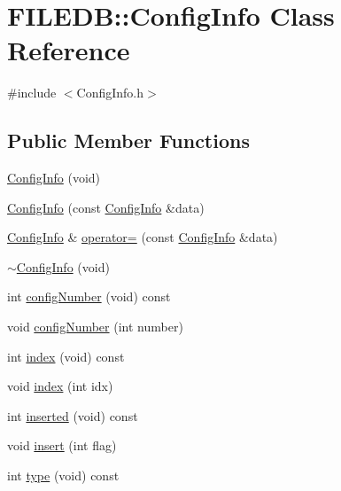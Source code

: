 \hypertarget{classFILEDB_1_1ConfigInfo}{}\section{F\+I\+L\+E\+DB\+:\+:Config\+Info Class Reference}
\label{classFILEDB_1_1ConfigInfo}


{\ttfamily \#include $<$Config\+Info.\+h$>$}

\subsection*{Public Member Functions}
\begin{DoxyCompactItemize}
\item 
\mbox{\hyperlink{classFILEDB_1_1ConfigInfo_a5aa818d39aeb907f27e064cab48c3522}{Config\+Info}} (void)
\item 
\mbox{\hyperlink{classFILEDB_1_1ConfigInfo_aa36d3fc640cd713ac561f89483c1b5f9}{Config\+Info}} (const \mbox{\hyperlink{classFILEDB_1_1ConfigInfo}{Config\+Info}} \&data)
\item 
\mbox{\hyperlink{classFILEDB_1_1ConfigInfo}{Config\+Info}} \& \mbox{\hyperlink{classFILEDB_1_1ConfigInfo_ac41b56638fe1c002bc2712d16c9cbecb}{operator=}} (const \mbox{\hyperlink{classFILEDB_1_1ConfigInfo}{Config\+Info}} \&data)
\item 
\mbox{\hyperlink{classFILEDB_1_1ConfigInfo_a26e3e1b90a453aac1419e42e7b13ce05}{$\sim$\+Config\+Info}} (void)
\item 
int \mbox{\hyperlink{classFILEDB_1_1ConfigInfo_ae4526dad4c6de972b1eb25ee8cd11c67}{config\+Number}} (void) const
\item 
void \mbox{\hyperlink{classFILEDB_1_1ConfigInfo_a226c79a0ee78d03894cfb6b7ed207992}{config\+Number}} (int number)
\item 
int \mbox{\hyperlink{classFILEDB_1_1ConfigInfo_a1ea886d3469211d480bf2c26d474c365}{index}} (void) const
\item 
void \mbox{\hyperlink{classFILEDB_1_1ConfigInfo_a150cd1f4438ac651aef387d251506dc7}{index}} (int idx)
\item 
int \mbox{\hyperlink{classFILEDB_1_1ConfigInfo_a45cc2aa85de0ccd89c06989bb9cff843}{inserted}} (void) const
\item 
void \mbox{\hyperlink{classFILEDB_1_1ConfigInfo_a59ae164a1b55687a88e37d876c4f05f6}{insert}} (int flag)
\item 
int \mbox{\hyperlink{classFILEDB_1_1ConfigInfo_a8053fc6dd889fb1e7c888359412fc0c7}{type}} (void) const
\item 

\end{DoxyCompactItemize}
